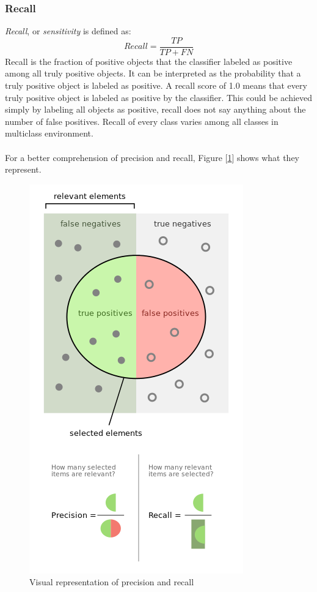 \documentclass[11pt]{article}
\begin{document}
      \subsubsection{Recall}
        {\it Recall}, or {\it sensitivity} \cite{confusion} is defined as:
        \begin{equation}
          Recall = \frac{TP}{TP + FN}
        \end{equation}
        Recall is the fraction of positive objects that the classifier labeled as positive among all truly positive objects. It can be interpreted as the probability that a truly positive object is labeled as positive. A recall score of 1.0 means that every truly positive object is labeled as positive by the classifier. This could be achieved simply by labeling all objects as positive, recall does not say anything about the number of false positives. Recall of every class varies among all classes in multiclass environment.
    \\~\\
    For a better comprehension of precision and recall, Figure [\ref{figure:precrec}] shows what they represent.
    \begin{figure}
      \centering
      \includegraphics[scale=0.8]{thesis_res/precrec.png}
      \caption{Visual representation of precision and recall \cite{precrec}}
      \label{figure:precrec}
    \end{figure}
    \newpage
\end{document}
